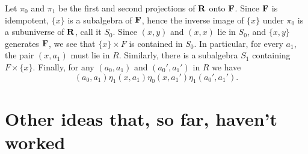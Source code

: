 \begin{remark}
  \label{rem:absorpt-theor-bk}
  Let $\pi_0$ and $\pi_1$ be the first and second projections of $\mathbf{R}$ onto $\mathbf{F}$.
  Since $\mathbf{F}$ is idempotent, $\{x\}$ is a subalgebra of $\mathbf{F}$, hence the inverse
  image of $\{x\}$ under $\pi_0$ is a subuniverse of $\mathbf{R}$, call it $S_0$.
  Since $(x,y)$ and $(x,x)$ lie in $S_0$, and $\{x,y\}$
  generates $\mathbf{F}$, we see that $\{x\}\times F$ is contained in $S_0$.
  In particular, for every $a_1$, the pair $(x,a_1)$ must lie in $R$.
  Similarly, there is a subalgebra $S_1$ containing
  $F\times \{x\}$. %
  Finally, for any $(a_0,a_1)$ and $(a_0',a_1')$ in $R$ we have
  \[
  (a_0,a_1) \mathrel{\eta_1} (x,a_1) \mathrel{\eta_0} (x,a_1') \mathrel{\eta_1} (a_0',a_1').
  \]
\end{remark}

\bigskip













\appendix

\section{Other ideas that, so far, haven't worked}









\appendix






